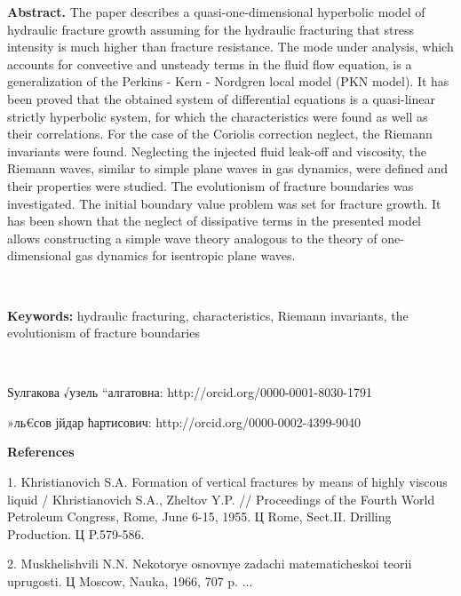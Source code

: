 \textbf{Abstract.} The paper describes a quasi-one-dimensional hyperbolic model of hydraulic fracture growth assuming for the hydraulic fracturing that stress intensity is much higher than fracture resistance. The mode under analysis, which accounts for convective and unsteady terms in the fluid flow equation, is a generalization of the Perkins - Kern - Nordgren local model (PKN model). It has been proved that the obtained system of differential equations is a quasi-linear strictly hyperbolic system, for which the characteristics were found as well as their correlations. For the case of the Coriolis correction neglect, the Riemann invariants were found. Neglecting the injected fluid leak-off and viscosity, the Riemann waves, similar to simple plane waves in gas dynamics, were defined and their properties were studied. The evolutionism of fracture boundaries was investigated. The initial boundary value problem was set for fracture growth. It has been shown that the neglect of dissipative terms in the presented model allows constructing a simple wave theory analogous to the theory of one-dimensional gas dynamics for isentropic plane waves. 



\ 



\textbf{Keywords:} hydraulic fracturing, characteristics, Riemann invariants, the evolutionism of fracture boundaries



\ 



Ѕулгакова √узель “алгатовна:	http://orcid.org/0000-0001-8030-1791



»ль€сов јйдар ћартисович:   http://orcid.org/0000-0002-4399-9040





\begin{center}


\textbf{References}


\end{center}



1.	Khristianovich S.A. Formation of vertical fractures by means of highly viscous liquid / Khristianovich S.A., Zheltov Y.P. // Proceedings of the Fourth World Petroleum Congress, Rome, June 6-15, 1955. Ц Rome, Sect.II. Drilling Production. Ц P.579-586.



2.	Muskhelishvili N.N. Nekotorye osnovnye zadachi matematicheskoi teorii uprugosti. Ц Moscow, Nauka, 1966, 707 p. ...



